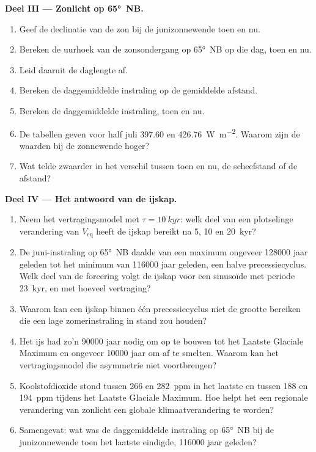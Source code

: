 \begin{problem}
\medskip\noindent\textbf{Deel III --- Zonlicht op \ang{65}~NB.}
\begin{enumerate}[resume]
  \item Geef de declinatie van de zon bij de junizonnewende toen en nu.
  \item Bereken de uurhoek van de zonsondergang op \ang{65}~NB op die dag, toen en nu.
  \item Leid daaruit de daglengte af.
  \item Bereken de daggemiddelde instraling op de gemiddelde afstand.
  \item Bereken de daggemiddelde instraling, toen en nu.
  \item De tabellen geven voor half juli 397.60 en \qty{426.76}{W.m^{-2}}. Waarom zijn de waarden
        bij de zonnewende hoger?
  \item Wat telde zwaarder in het verschil tussen toen en nu, de scheefstand of de afstand?
\end{enumerate}

\medskip\noindent\textbf{Deel IV --- Het antwoord van de ijskap.}
\begin{enumerate}[resume]
  \item Neem het vertragingsmodel met $\tau = \qty{10}{kyr}$: welk deel van een plotselinge verandering van
        $V_{\mathrm{eq}}$ heeft de ijskap bereikt na 5, 10 en \qty{20}{kyr}?
  \item De juni-instraling op \ang{65}~NB daalde van een maximum ongeveer \num{128000} jaar geleden tot het
        minimum van \num{116000} jaar geleden, een halve precessiecyclus. Welk deel van de forcering volgt de ijskap
        voor een sinusoïde met periode \qty{23}{kyr}, en met hoeveel vertraging?
  \item Waarom kan een ijskap binnen één precessiecyclus niet de grootte bereiken die een lage
        zomerinstraling in stand zou houden?
  \item Het ijs had zo'n \num{90000} jaar nodig om op te bouwen tot het Laatste Glaciale Maximum en ongeveer
        \num{10000} jaar om af te smelten. Waarom kan het vertragingsmodel die asymmetrie niet voortbrengen?
  \item Koolstofdioxide stond tussen 266 en \qty{282}{ppm} in het laatste  en tussen
        188 en \qty{194}{ppm} tijdens het Laatste Glaciale Maximum. Hoe helpt het een regionale verandering van
        zonlicht een globale klimaatverandering te worden?
  \item Samengevat: wat was de daggemiddelde instraling op \ang{65}~NB bij de junizonnewende toen het
        laatste  eindigde, \num{116000} jaar geleden?
\end{enumerate}
\end{problem}
